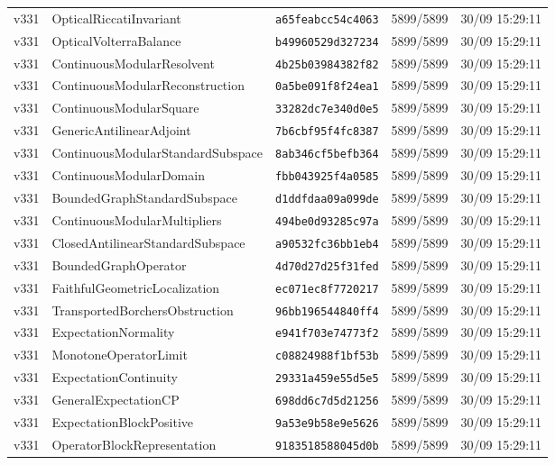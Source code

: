 \documentclass[11pt]{article}
\theoremstyle{definition}\newtheorem{deriv}{Derivação}
\begin{document}
{\begin{longtable}{@{}lllll@{}}
v331 & OpticalRiccatiInvariant & \texttt{a65feabcc54c4063} & 5899/5899 & 30/09 15:29:11 \\
v331 & OpticalVolterraBalance & \texttt{b49960529d327234} & 5899/5899 & 30/09 15:29:11 \\
v331 & ContinuousModularResolvent & \texttt{4b25b03984382f82} & 5899/5899 & 30/09 15:29:11 \\
v331 & ContinuousModularReconstruction & \texttt{0a5be091f8f24ea1} & 5899/5899 & 30/09 15:29:11 \\
v331 & ContinuousModularSquare & \texttt{33282dc7e340d0e5} & 5899/5899 & 30/09 15:29:11 \\
v331 & GenericAntilinearAdjoint & \texttt{7b6cbf95f4fc8387} & 5899/5899 & 30/09 15:29:11 \\
v331 & ContinuousModularStandardSubspace & \texttt{8ab346cf5befb364} & 5899/5899 & 30/09 15:29:11 \\
v331 & ContinuousModularDomain & \texttt{fbb043925f4a0585} & 5899/5899 & 30/09 15:29:11 \\
v331 & BoundedGraphStandardSubspace & \texttt{d1ddfdaa09a099de} & 5899/5899 & 30/09 15:29:11 \\
v331 & ContinuousModularMultipliers & \texttt{494be0d93285c97a} & 5899/5899 & 30/09 15:29:11 \\
v331 & ClosedAntilinearStandardSubspace & \texttt{a90532fc36bb1eb4} & 5899/5899 & 30/09 15:29:11 \\
v331 & BoundedGraphOperator & \texttt{4d70d27d25f31fed} & 5899/5899 & 30/09 15:29:11 \\
v331 & FaithfulGeometricLocalization & \texttt{ec071ec8f7720217} & 5899/5899 & 30/09 15:29:11 \\
v331 & TransportedBorchersObstruction & \texttt{96bb196544840ff4} & 5899/5899 & 30/09 15:29:11 \\
v331 & ExpectationNormality & \texttt{e941f703e74773f2} & 5899/5899 & 30/09 15:29:11 \\
v331 & MonotoneOperatorLimit & \texttt{c08824988f1bf53b} & 5899/5899 & 30/09 15:29:11 \\
v331 & ExpectationContinuity & \texttt{29331a459e55d5e5} & 5899/5899 & 30/09 15:29:11 \\
v331 & GeneralExpectationCP & \texttt{698dd6c7d5d21256} & 5899/5899 & 30/09 15:29:11 \\
v331 & ExpectationBlockPositive & \texttt{9a53e9b58e9e5626} & 5899/5899 & 30/09 15:29:11 \\
v331 & OperatorBlockRepresentation & \texttt{9183518588045d0b} & 5899/5899 & 30/09 15:29:11 \\

\end{longtable}}
\end{document}
